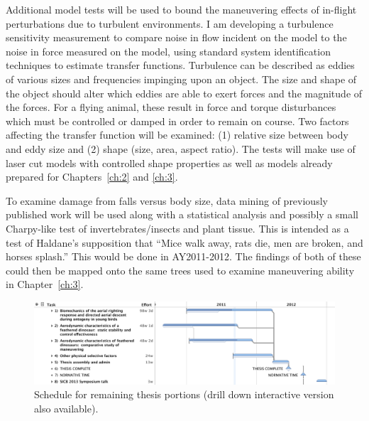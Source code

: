 Additional model tests will be used to bound the maneuvering effects of in-flight perturbations due to turbulent environments.  I am developing a turbulence sensitivity measurement to compare noise in flow incident on the model to the noise in force measured on the model, using standard system identification techniques to estimate transfer functions.  Turbulence can be described as eddies of various sizes and frequencies impinging upon an object.  The size and shape of the object should alter which eddies are able to exert forces and the magnitude of the forces. For a flying animal, these result in force and torque disturbances which must be controlled or damped in order to remain on course.  Two factors affecting the transfer function will be examined: (1) relative size between body and eddy size and (2) shape (size, area, aspect ratio).  The tests will make use of laser cut models with controlled shape properties as well as models already prepared for Chapters~\ref{ch:2} and \ref{ch:3}.  

To examine damage from falls versus body size, data mining of previously published work will be used along with a statistical analysis and possibly a small Charpy-like test of invertebrates/insects and plant tissue.  This is intended as a test of Haldane's supposition that ``Mice walk away, rats die, men are broken, and horses splash.''  This would be done in AY2011-2012.  The findings of both of these could then be mapped onto the same trees used to examine maneuvering ability in Chapter~\ref{ch:3}.







%

\begin{figure}
\caption{Schedule for remaining thesis portions (drill down interactive version also available).}
\label{fig:sched}
\includegraphics[width=9in]{figures/intro-thesis-schedule-gantt.pdf}
\end{figure}



\setcounter{secnumdepth}{3}
\renewcommand{\thefigure}{\thechapter.\arabic{figure}}
\renewcommand{\thetable}{\thechapter.\arabic{table}}

